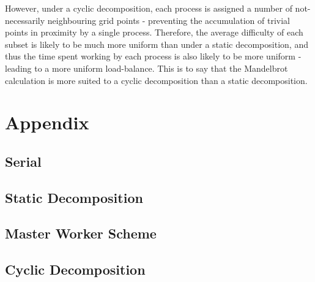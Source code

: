 \documentclass{article}
\begin{document}
However, under a cyclic decomposition, each process is assigned a number of
not-necessarily neighbouring grid points - preventing the accumulation of
trivial points in proximity by a single process.
Therefore, the average difficulty of each subset is likely to be much more
uniform than under a static decomposition, and thus the time spent working by
each process is also likely to be more uniform - leading to a more uniform
load-balance.
This is to say that the Mandelbrot calculation is more suited to a cyclic
decomposition than a static decomposition.

\clearpage
\appendix
\section{Appendix}
\label{sec:appendix}

\subsection{Serial}
\label{sec:serial-code}



\newpage
\subsection{Static Decomposition}
\label{sec:static-code}



\newpage
\subsection{Master Worker Scheme}
\label{sec:master-worker-code}



\newpage
\subsection{Cyclic Decomposition}
\label{sec:cyclic-code}


\end{document}
